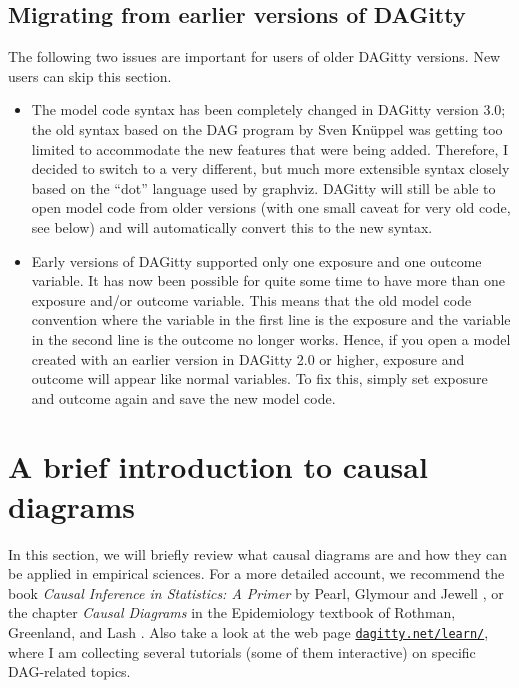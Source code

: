 \documentclass[a4paper]{article} %
\newcommand{\pp}{{\sc DAG}itty\xspace}
\begin{document}
\subsection{Migrating from earlier versions of \pp}

The following two issues are important for users of older \pp versions. New users
can skip this section.

\begin{itemize}
\item The model code syntax has been completely changed in DAGitty version 3.0; the old syntax
	based on the DAG program by Sven Kn\"uppel \cite{KnueppelS2010} was getting too limited to accommodate the new features that were being added. Therefore, I decided to switch to a very different, but much more extensible syntax closely based on the ``dot'' language used by graphviz.
\pp will still be able to open model code from older versions (with one small caveat
for very old code, see below) and will automatically convert this to the new syntax.
\item Early versions of DAGitty supported only one exposure and one outcome variable. It has
now been possible for quite some time to have more than one exposure and/or outcome
variable. This means that the old model code convention where the variable in the first line
is the exposure and the variable in the second line is the outcome no longer works. Hence,
if you open a model created with an earlier version in DAGitty 2.0 or higher,
exposure and outcome will appear like normal variables. To fix this, simply set exposure and outcome again 
and save the new model code.
\end{itemize}

\section{A brief introduction to causal diagrams}

\label{sec:dagintro}

In this section, we will briefly review what causal diagrams are and how they can be 
applied in empirical sciences. For a more detailed account, we recommend 
the book \emph{Causal Inference in Statistics: A Primer} by Pearl, Glymour and Jewell \cite{Pearl2016}, or the chapter \emph{Causal Diagrams} in the Epidemiology 
textbook of Rothman, Greenland, and Lash \cite{RothmanGL2008}. 
Also take a look at the web page \href{http://www.dagitty.net/learn/}{\tt dagitty.net/learn/}, where I am collecting several tutorials (some of them interactive) on specific DAG-related  topics.
 
\end{document}
